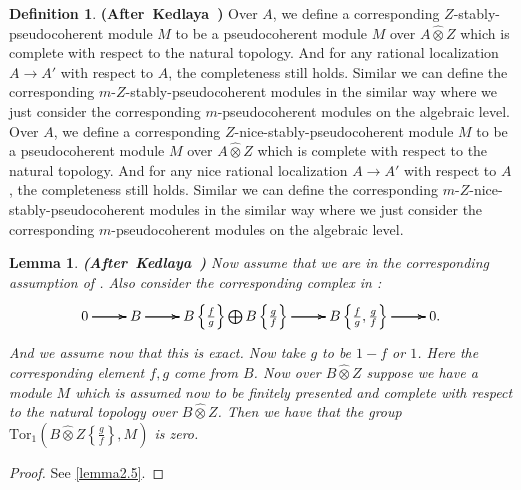 \documentclass[12pt]{amsart}
\newtheorem{lemma}[theorem]{Lemma}
\theoremstyle{definition}
\newtheorem{definition}[theorem]{Definition}
\numberwithin{equation}{section}
\begin{document}
\begin{definition}\mbox{\bf{(After Kedlaya \cite[Definition 1.9.1]{Ked2})}}
Over $A$, we define a corresponding $Z$-stably-pseudocoherent module $M$ to be a pseudocoherent module $M$ over $A\widehat{\otimes}Z$ which is complete with respect to the natural topology. And for any rational localization $A\rightarrow A'$ with respect to $A$, the completeness still holds. Similar we can define the corresponding $m$-$Z$-stably-pseudocoherent modules in the similar way where we just consider the corresponding $m$-pseudocoherent modules on the algebraic level. Over $A$, we define a corresponding $Z$-nice-stably-pseudocoherent module $M$ to be a pseudocoherent module $M$ over $A\widehat{\otimes}Z$ which is complete with respect to the natural topology. And for any nice rational localization $A\rightarrow A'$ with respect to $A$, the completeness still holds. Similar we can define the corresponding $m$-$Z$-nice-stably-pseudocoherent modules in the similar way where we just consider the corresponding $m$-pseudocoherent modules on the algebraic level.
\end{definition}



\begin{lemma} \mbox{\bf{(After Kedlaya \cite[Lemma 1.9.3]{Ked2})}}
Now assume that we are in the corresponding assumption of \cite[1.7.1]{Ked2}. Also consider the corresponding complex in \cite[1.6.15.1]{Ked2}:
\[
\xymatrix@C+0pc@R+0pc{
0 \ar[r] \ar[r] \ar[r] &B \ar[r] \ar[r] \ar[r] &B\left\{\frac{f}{g}\right\}\bigoplus B\left\{\frac{g}{f}\right\} \ar[r] \ar[r] \ar[r] &B\left\{\frac{f}{g},\frac{g}{f}\right\} \ar[r] \ar[r] \ar[r] &0.
}
\]	
And we assume now that this is exact. Now take $g$ to be $1-f$ or $1$. Here the corresponding element $f,g$ come from $B$. Now over $B\widehat{\otimes}Z$ suppose we have a module $M$ which is assumed now to be finitely presented and complete with respect to the natural topology over $B\widehat{\otimes}Z$. Then we have that the group $\mathrm{Tor}_1(B\widehat{\otimes}Z\left\{\frac{g}{f}\right\},M)$ is zero. 	
\end{lemma}

\begin{proof}
See \cref{lemma2.5}.
\end{proof}
\end{document}
